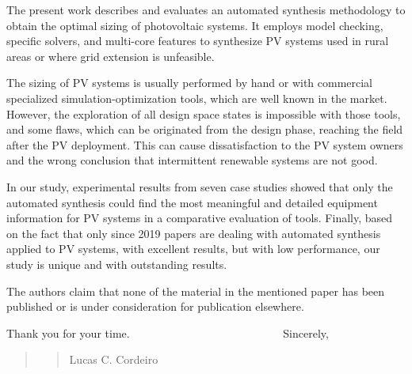 \documentclass[11pt]{article}
\newcommand\vi{\vspace{\baselineskip}}
\begin{document}
The present work describes and evaluates an automated synthesis methodology to obtain the optimal sizing of photovoltaic systems. It employs model checking, specific solvers, and multi-core features to synthesize PV systems used in rural areas or where grid extension is unfeasible.

The sizing of PV systems is usually performed by hand or with commercial specialized simulation-optimization tools, which are well known in the market. However, the exploration of all design space states is impossible with those tools, and some flaws, which can be originated from the design phase, reaching the field after the PV deployment. This can cause dissatisfaction to the PV system owners and the wrong conclusion that intermittent renewable systems are not good.
   
In our study, experimental results from seven case studies showed that only the automated synthesis could find the most meaningful and detailed equipment information for PV systems in a comparative evaluation of tools. Finally, based on the fact that only since 2019 papers are dealing with automated synthesis applied to PV systems, with excellent results, but with low performance, our study is unique and with outstanding results.

The authors claim that none of the material in the mentioned paper has been published or is under consideration for publication elsewhere.

\vi
Thank you for your time.
\vi
\indent
~~~~~~~~~~~~~~~~~~~~~~~~~~~Sincerely,\\

\begin{quote}
\begin{quote}
\begin{flushright}



Lucas C. Cordeiro~~~~~~~
\end{flushright}
\end{quote}
\end{quote}


 
 
\end{document}
